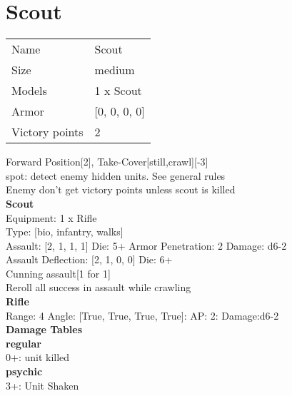 




\pagebreak\pagebreak

\section{ Scout }

\begin{tabular}{ll}
  Name & Scout \\
  Size & medium\\
  Models & 1 x Scout\\
  Armor & [0, 0, 0, 0]\\
  Victory points & 2\\
\end{tabular}

Forward Position[2], Take-Cover[still,crawl][-3]\\ 
spot: detect enemy hidden units. See general rules\\ 
Enemy don't get victory points unless scout is killed\\

{\bf Scout } \\
Equipment: 1 x Rifle \\
Type: [bio, infantry, walks] \\

Assault: [2, 1, 1, 1] Die: 5+ Armor Penetration: 2 Damage: d6-2 \\
Assault Deflection: [2, 1, 0, 0] Die: 6+\\
\indent Cunning assault[1 for 1]\\ 
Reroll all success in assault while crawling\\ 
 



{\bf Rifle } \\



Range: 4  Angle: [True, True, True, True]: AP: 2: Damage:d6-2 \\




 





{\bf Damage Tables} \\
 {\bf regular } \\
0+: unit killed \\
 {\bf psychic } \\
3+: Unit Shaken \\










\pagebreak
